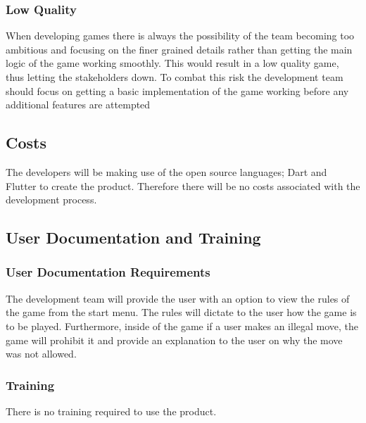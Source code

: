 \documentclass[12pt, titlepage]{article}
\begin{document}
\subsubsection{Low Quality}
When developing games there is always the possibility of the team becoming too ambitious and focusing on the finer grained details rather than getting the main logic of the game working smoothly. This would result in a low quality game, thus letting the stakeholders down. To combat this risk the development team should focus on getting a basic implementation of the game working before any additional features are attempted

\subsection{Costs}
The developers will be making use of the open source languages; Dart and Flutter to create the product. Therefore there will be no costs associated with the development process.

\subsection{User Documentation and Training}
\subsubsection{User Documentation Requirements}
The development team will provide the user with an option to view the rules of the game from the start menu. The rules will dictate to the user how the game is to be played. Furthermore, inside of the game if a user makes an illegal move, the game will prohibit it and provide an explanation to the user on why the move was not allowed.
\subsubsection{Training}
There is no training required to use the product.
\end{document}
